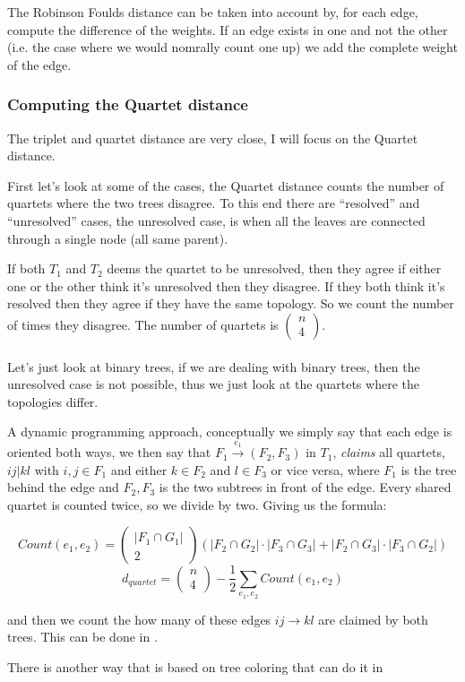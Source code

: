     The Robinson Foulds distance can be taken into account by, for each edge, 
    compute the difference of the weights. If an edge exists in one and not the 
    other (i.e. the case where we would nomrally count one up) we add the 
    complete weight of the edge.
    
    \subsubsection{Computing the Quartet distance}
    The triplet and quartet distance are very close, I will focus on the 
    Quartet distance.
    
    First let's look at some of the cases, the Quartet distance counts the 
    number of quartets where the two trees disagree. To this end there are 
    ``resolved'' and ``unresolved'' cases, the unresolved case, is when all the 
    leaves are connected through a single node (all same parent).
    
    If both $T_1$ and $T_2$ deems the quartet to be unresolved, then they agree 
    if either one or the other think it's unresolved then they disagree. If 
    they both think it's resolved then they agree if they have the same 
    topology. So we count the number of times they disagree. The number of 
    quartets is $\begin{pmatrix}
    n\\
    4
    \end{pmatrix}$.
    \\
    \\
    Let's just look at binary trees, if we are dealing with binary trees, then 
    the unresolved case is not possible, thus we just look at the quartets 
    where the topologies differ.
    
    A dynamic programming approach, conceptually we simply say that each edge 
    is oriented both ways, we then say that $F_1 \xrightarrow{e_1}(F_2, F_3)$ 
    in $T_1$, \textit{claims} all quartets, $ij|kl$ with $i,j \in F_1$ and 
    either $ k \in F_2$ and $l \in F_3$ or vice versa, where $F_1$ is the tree 
    behind the edge and $F_2, F_3$ is the two subtrees in front of the edge. 
    Every shared quartet is counted twice, so we divide by two. Giving us the 
    formula:
    
    \begin{equation*}
        Count(e_1,e_2) = \begin{pmatrix}
        |F_1 \cap G_1|\\
        2
        \end{pmatrix}
        (|F_2 \cap G_2| \cdot |F_3 \cap G_3| + |F_2 \cap G_3| \cdot |F_3 \cap 
        G_2|)
    \end{equation*}
    \begin{equation*}
        d_{quartet}=\begin{pmatrix}
        n\\
        4
        \end{pmatrix}
        - \frac{1}{2} \sum_{e_1,e_2} Count(e_1, e_2)
    \end{equation*}
    
     and then we count the how many of these edges $ij 
    \rightarrow kl$ are claimed by both trees. This can be done in .
    
    There is another way that is based on tree coloring that can do it in 
